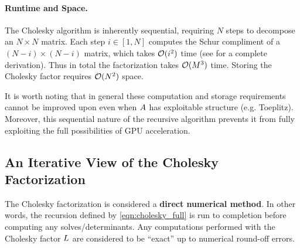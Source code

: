 \paragraph{Runtime and Space.}
The Cholesky algorithm is inherently sequential, requiring $N$ steps to decompose an $N \times N$ matrix.
Each step $i \in [1, N]$ computes the Schur compliment of a $(N-i) \times (N-i)$ matrix, which takes $\bigo{i^2}$ time (see \citep[][Sec. 4.2]{golub2012matrix} for a complete derivation).
Thus in total the factorization takes $\bigo{M^3}$ time.
Storing the Cholesky factor requires $\bigo{N^2}$ space.

It is worth noting that in general these computation and storage requirements cannot be improved upon even when $A$ has exploitable structure (e.g. Toeplitz).
Moreover, this sequential nature of the recursive algorithm prevents it from fully exploiting the full possibilities of GPU acceleration.



\subsection{An Iterative View of the Cholesky Factorization}
The Cholesky factorization is considered a {\bf direct numerical method}.
In other words, the recursion defined by \cref{eqn:cholesky_full} is run to completion before computing any solves/determinants.
Any computations performed with the Cholesky factor $L$ are considered to be ``exact'' up to numerical round-off errors.

